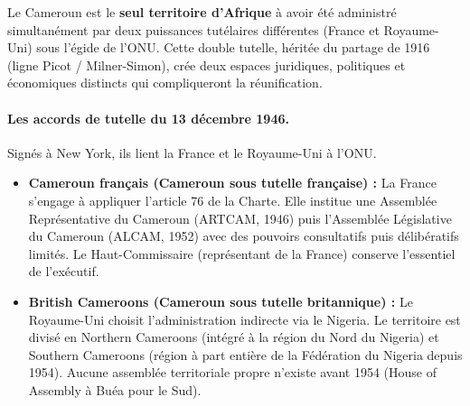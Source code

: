 \documentclass[11pt]{article}
\begin{document}
\begin{savaistu}
Le Cameroun est le \textbf{seul territoire d'Afrique} à avoir été administré simultanément par deux puissances tutélaires différentes (France et Royaume-Uni) sous l'égide de l'ONU. Cette double tutelle, héritée du partage de 1916 (ligne Picot / Milner-Simon), crée deux espaces juridiques, politiques et économiques distincts qui compliqueront la réunification.
\end{savaistu}

\paragraph{Les accords de tutelle du 13 décembre 1946.}
Signés à New York, ils lient la France et le Royaume-Uni à l'ONU.
\begin{itemize}
    \item \textbf{Cameroun français (Cameroun sous tutelle française) :} La France s'engage à appliquer l'article 76 de la Charte. Elle institue une Assemblée Représentative du Cameroun (ARTCAM, 1946) puis l'Assemblée Législative du Cameroun (ALCAM, 1952) avec des pouvoirs consultatifs puis délibératifs limités. Le Haut-Commissaire (représentant de la France) conserve l'essentiel de l'exécutif.
    \item \textbf{British Cameroons (Cameroun sous tutelle britannique) :} Le Royaume-Uni choisit l'administration indirecte via le Nigeria. Le territoire est divisé en Northern Cameroons (intégré à la région du Nord du Nigeria) et Southern Cameroons (région à part entière de la Fédération du Nigeria depuis 1954). Aucune assemblée territoriale propre n'existe avant 1954 (House of Assembly à Buéa pour le Sud).
\end{itemize}
\end{document}
